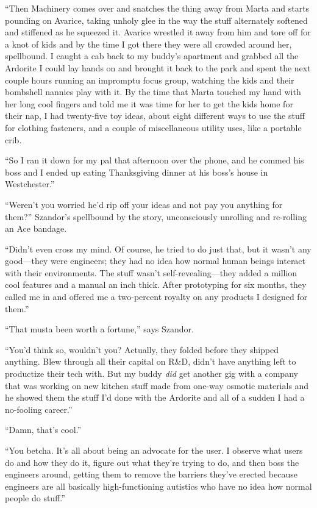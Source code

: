 “Then Machinery comes over and snatches the thing away from Marta
and starts pounding on Avarice, taking unholy glee in the way the
stuff alternately softened and stiffened as he squeezed it. Avarice
wrestled it away from him and tore off for a knot of kids and by
the time I got there they were all crowded around her, spellbound.
I caught a cab back to my buddy’s apartment and grabbed all the
Ardorite I could lay hands on and brought it back to the park and
spent the next couple hours running an impromptu focus group,
watching the kids and their bombshell nannies play with it. By the
time that Marta touched my hand with her long cool fingers and told
me it was time for her to get the kids home for their nap, I had
twenty-five toy ideas, about eight different ways to use the stuff
for clothing fasteners, and a couple of miscellaneous utility uses,
like a portable crib.

“So I ran it down for my pal that afternoon over the phone, and he
commed his boss and I ended up eating Thanksgiving dinner at his
boss’s house in Westchester.”

“Weren’t you worried he’d rip off your ideas and not pay you
anything for them?” Szandor’s spellbound by the story,
unconsciously unrolling and re-rolling an Ace bandage.

“Didn’t even cross my mind. Of course, he tried to do just that,
but it wasn’t any good—they were engineers; they had no idea how
normal human beings interact with their environments. The stuff
wasn’t self-revealing—they added a million cool features and a
manual an inch thick. After prototyping for six months, they called
me in and offered me a two-percent royalty on any products I
designed for them.”

“That musta been worth a fortune,” says Szandor.

“You’d think so, wouldn’t you? Actually, they folded before they
shipped anything. Blew through all their capital on R\&D, didn’t
have anything left to productize their tech with. But my buddy
\emph{did} get another gig with a company that was working on new
kitchen stuff made from one-way osmotic materials and he showed
them the stuff I’d done with the Ardorite and all of a sudden I had
a no-fooling career.”

“Damn, that’s cool.”

“You betcha. It’s all about being an advocate for the user. I
observe what users do and how they do it, figure out what they’re
trying to do, and then boss the engineers around, getting them to
remove the barriers they’ve erected because engineers are all
basically high-functioning autistics who have no idea how normal
people do stuff.”

